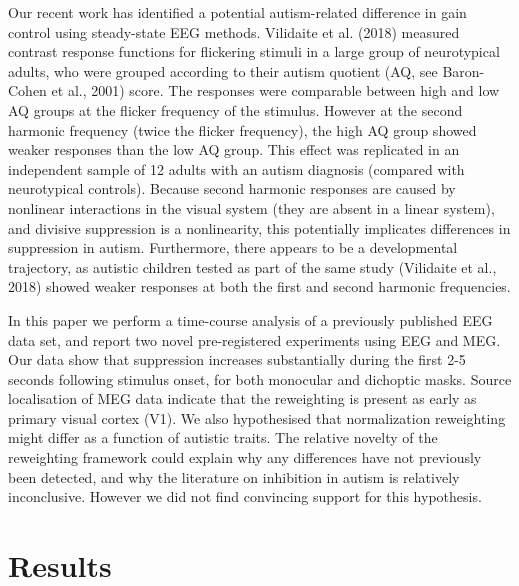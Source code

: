 \documentclass[
]{article}
\begin{document}
Our recent work has identified a potential autism-related difference in gain control using steady-state EEG methods. Vilidaite et al. (2018) measured contrast response functions for flickering stimuli in a large group of neurotypical adults, who were grouped according to their autism quotient (AQ, see Baron-Cohen et al., 2001) score. The responses were comparable between high and low AQ groups at the flicker frequency of the stimulus. However at the second harmonic frequency (twice the flicker frequency), the high AQ group showed weaker responses than the low AQ group. This effect was replicated in an independent sample of 12 adults with an autism diagnosis (compared with neurotypical controls). Because second harmonic responses are caused by nonlinear interactions in the visual system (they are absent in a linear system), and divisive suppression is a nonlinearity, this potentially implicates differences in suppression in autism. Furthermore, there appears to be a developmental trajectory, as autistic children tested as part of the same study (Vilidaite et al., 2018) showed weaker responses at both the first and second harmonic frequencies.

In this paper we perform a time-course analysis of a previously published EEG data set, and report two novel pre-registered experiments using EEG and MEG. Our data show that suppression increases substantially during the first 2-5 seconds following stimulus onset, for both monocular and dichoptic masks. Source localisation of MEG data indicate that the reweighting is present as early as primary visual cortex (V1). We also hypothesised that normalization reweighting might differ as a function of autistic traits. The relative novelty of the reweighting framework could explain why any differences have not previously been detected, and why the literature on inhibition in autism is relatively inconclusive. However we did not find convincing support for this hypothesis.

\hypertarget{results}{%
\section{Results}\label{results}}
\end{document}
